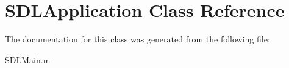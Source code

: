 \hypertarget{interface_s_d_l_application}{
\section{SDLApplication Class Reference}
\label{interface_s_d_l_application}
}


The documentation for this class was generated from the following file:\begin{DoxyCompactItemize}
\item 
SDLMain.m\end{DoxyCompactItemize}
